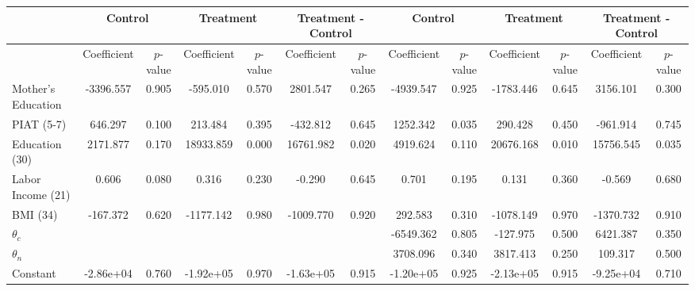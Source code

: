 \begin{tabular}{lcccccccccccc} \toprule
&\multicolumn{2}{c}{Control} & \multicolumn{2}{c}{Treatment} & \multicolumn{2}{c}{Treatment - Control} & \multicolumn{2}{c}{Control} & \multicolumn{2}{c}{Treatment} & \multicolumn{2}{c}{Treatment - Control} \\ \midrule
 & Coefficient  & $p$-value  & Coefficient  & $p$-value & Coefficient  & $p$-value  & Coefficient  & $p$-value  & Coefficient  & $p$-value  & Coefficient  & $p$-value \\ \midrule
Mother's Education & -3396.557 &     0.905 &  -595.010 &     0.570 &  2801.547 &     0.265 & -4939.547 &     0.925 & -1783.446 &     0.645 &  3156.101 &     0.300 \\  
PIAT (5-7)&   646.297 &     0.100 &   213.484 &     0.395 &  -432.812 &     0.645 &  1252.342 &     0.035 &   290.428 &     0.450 &  -961.914 &     0.745 \\  
Education (30) &  2171.877 &     0.170 & 18933.859 &     0.000 & 16761.982 &     0.020 &  4919.624 &     0.110 & 20676.168 &     0.010 & 15756.545 &     0.035 \\  
Labor Income (21) &     0.606 &     0.080 &     0.316 &     0.230 &    -0.290 &     0.645 &     0.701 &     0.195 &     0.131 &     0.360 &    -0.569 &     0.680 \\  
BMI (34)  &  -167.372 &     0.620 & -1177.142 &     0.980 & -1009.770 &     0.920 &   292.583 &     0.310 & -1078.149 &     0.970 & -1370.732 &     0.910 \\  
$\theta_{c}$ &         &        &        &        &        &        &-6549.362 &     0.805 &  -127.975 &     0.500 &  6421.387 &     0.350 \\  
$\theta_{n}$ &         &        &        &        &        &        & 3708.096 &     0.340 &  3817.413 &     0.250 &   109.317 &     0.500 \\  
Constant & -2.86e+04 &     0.760 & -1.92e+05 &     0.970 & -1.63e+05 &     0.915 & -1.20e+05 &     0.925 & -2.13e+05 &     0.915 & -9.25e+04 &     0.710 \\  
\bottomrule \end{tabular}
